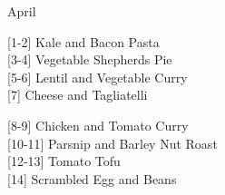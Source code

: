 		\begin{menu}{April}
    
    \begin{recipelist}
    
        {\scriptsize[1-2]} Kale and Bacon Pasta\\
        {\scriptsize[3-4]} Vegetable Shepherds Pie\\
        {\scriptsize[5-6]} Lentil and Vegetable Curry\\
        {\scriptsize[7]} Cheese and Tagliatelli\\%
    \end{recipelist}%
    \begin{recipelist}
    
        {\scriptsize[8-9]} Chicken and Tomato Curry\\
        {\scriptsize[10-11]} Parsnip and Barley Nut Roast\\
        {\scriptsize[12-13]} Tomato Tofu\\
        {\scriptsize[14]} Scrambled Egg and Beans\\%
    \end{recipelist}\par%
  

\end{menu}
